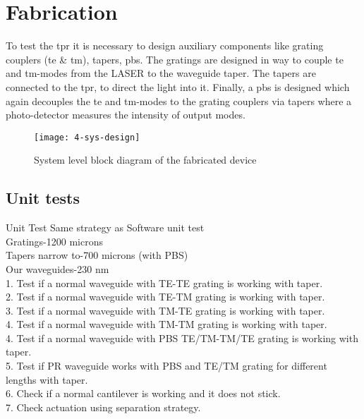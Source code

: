 \documentclass[../report.tex]{subfiles}
\begin{document}
	
	
\chapter{Fabrication}
To test the \gls{tpr} it is necessary to design auxiliary components like grating couplers (\gls{te} \& \gls{tm}), tapers, \gls{pbs}. The gratings are designed in way to couple \gls{te} and \gls{tm}-modes from the LASER to the waveguide taper. The tapers are connected to the \gls{tpr}, to direct the light into it. Finally, a \gls{pbs} is designed which again decouples the \gls{te} and \gls{tm}-modes to the grating couplers via tapers where a photo-detector measures the intensity of output modes.  

\begin{figure}[H] %
	\centering
	\texttt{[image: 4-sys-design]}
	\caption{System level block diagram of the fabricated device}
	\label{fig:4_sys_design}
\end{figure}

\section{Unit tests}
Unit Test 
Same strategy as Software unit test\\
Gratings-1200 microns\\
Tapers narrow to-700 microns (with PBS)\\
Our waveguides-230 nm\\
1. Test if a normal waveguide with TE-TE grating is working with taper.\\
2. Test if a normal waveguide with TE-TM grating is working with taper.\\
3. Test if a normal waveguide with TM-TE grating is working with taper.\\
4. Test if a normal waveguide with TM-TM grating is working with taper.\\
4. Test if a normal waveguide with PBS TE/TM-TM/TE grating is working with taper.\\
5. Test if PR waveguide works with PBS and TE/TM grating for different lengths with taper.\\
6. Check if a normal cantilever is working and it does not stick.\\
7. Check actuation using separation strategy.\\
\end{document}
